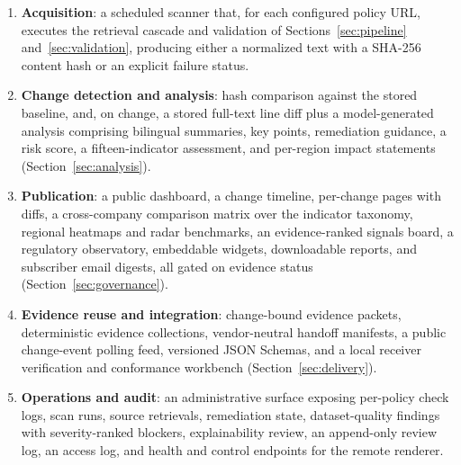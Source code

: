 \documentclass[11pt]{article}
\begin{document}
\begin{enumerate}[leftmargin=*]
  \item \textbf{Acquisition}: a scheduled scanner that, for each configured
  policy URL, executes the retrieval cascade and validation of
  Sections~\ref{sec:pipeline} and~\ref{sec:validation}, producing either a
  normalized text with a SHA-256 content hash or an explicit failure status.
  \item \textbf{Change detection and analysis}: hash comparison against the
  stored baseline, and, on change, a stored full-text line diff plus a
  model-generated analysis comprising bilingual summaries, key points,
  remediation guidance, a risk score, a fifteen-indicator assessment, and
  per-region impact statements (Section~\ref{sec:analysis}).
  \item \textbf{Publication}: a public dashboard, a change timeline, per-change
  pages with diffs, a cross-company comparison matrix over the indicator
  taxonomy, regional heatmaps and radar benchmarks, an evidence-ranked signals
  board, a regulatory observatory, embeddable widgets, downloadable reports, and
  subscriber email digests, all gated on evidence status
  (Section~\ref{sec:governance}).
  \item \textbf{Evidence reuse and integration}: change-bound evidence packets,
  deterministic evidence collections, vendor-neutral handoff manifests, a
  public change-event polling feed, versioned JSON Schemas, and a local receiver
  verification and conformance workbench (Section~\ref{sec:delivery}).
  \item \textbf{Operations and audit}: an administrative surface exposing
  per-policy check logs, scan runs, source retrievals, remediation state,
  dataset-quality findings with severity-ranked blockers, explainability review,
  an append-only review log, an access log, and health and control endpoints for
  the remote renderer.
\end{enumerate}
\end{document}
